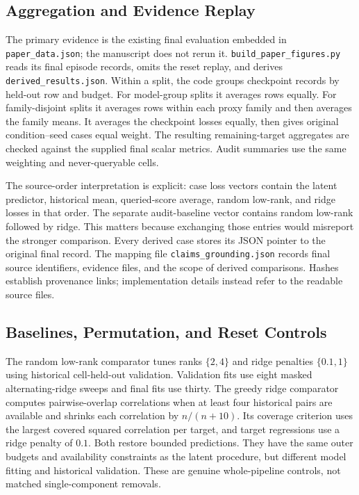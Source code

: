 \documentclass{article}
\begin{document}
\subsection{Aggregation and Evidence Replay}
\label{sec:aggregation}
The primary evidence is the existing final evaluation embedded in \texttt{paper\_data.json}; the manuscript does not rerun it. \texttt{build\_paper\_figures.py} reads its final episode records, omits the reset replay, and derives \texttt{derived\_results.json}. Within a split, the code groups checkpoint records by held-out row and budget. For model-group splits it averages rows equally. For family-disjoint splits it averages rows within each proxy family and then averages the family means. It averages the checkpoint losses equally, then gives original condition--seed cases equal weight. The resulting remaining-target aggregates are checked against the supplied final scalar metrics. Audit summaries use the same weighting and never-queryable cells.

The source-order interpretation is explicit: case loss vectors contain the latent predictor, historical mean, queried-score average, random low-rank, and ridge losses in that order. The separate audit-baseline vector contains random low-rank followed by ridge. This matters because exchanging those entries would misreport the stronger comparison. Every derived case stores its JSON pointer to the original final record. The mapping file \texttt{claims\_grounding.json} records final source identifiers, evidence files, and the scope of derived comparisons. Hashes establish provenance links; implementation details instead refer to the readable source files.

\subsection{Baselines, Permutation, and Reset Controls}
The random low-rank comparator tunes ranks $\{2,4\}$ and ridge penalties $\{0.1,1\}$ using historical cell-held-out validation. Validation fits use eight masked alternating-ridge sweeps and final fits use thirty. The greedy ridge comparator computes pairwise-overlap correlations when at least four historical pairs are available and shrinks each correlation by $n/(n+10)$. Its coverage criterion uses the largest covered squared correlation per target, and target regressions use a ridge penalty of $0.1$. Both restore bounded predictions. They have the same outer budgets and availability constraints as the latent procedure, but different model fitting and historical validation. These are genuine whole-pipeline controls, not matched single-component removals.
\end{document}
